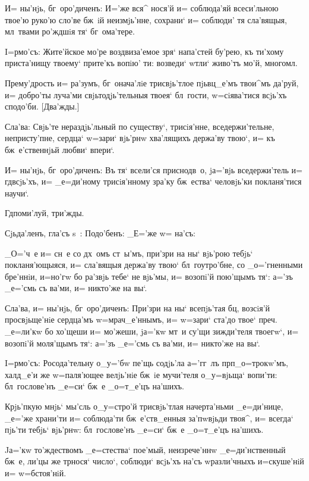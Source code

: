 И= ны'нjь, бг~оро'диченъ: И='же вся^ нося'й и= 
соблюда'яй всеси'льною твое'ю руко'ю сло'ве бж~iй 
неизмjь'нне, сохрани` и= соблюди' тя сла'вящыя, мл~твами 
ро'ждшiя тя` бг~ома'тере.


I=рмо'съ: Жите'йское мо'ре воздвиза'емое зря` 
напа'стей бу'рею, къ ти'хому приста'нищу твоему` прите'къ 
вопiю' ти: возведи` w\т тли` живо'тъ мо'й, многомл.

Прему'дрость и= ра'зумъ, бг~онача'лiе трисвjь'тлое 
пjьвц_е'мъ твои^мъ да'руй, и= добро'ты луча'ми 
свjьтодjь'тельныя твоея` бл~гости, w=сiява'тися всjь'хъ 
сподо'би. [Два'жды.]

Сла'ва: Свjь'те нераздjь'льный по существу`, 
трисiя'нне, вседержи'тельне, непристу'пне, сердца` 
w=зари` вjь'рнw хва'лящихъ держа'ву твою`, и= къ 
бж~е'ственнjьй любви` впери`. 

И= ны'нjь, бг~оро'диченъ: Въ тя` всели'ся приснодв~о, 
jа='вjь вседержи'тель и= гд всjь'хъ, и= _е=ди'ному 
трисiя'нному зра'ку бж~ества` человjь'ки покланя'тися 
научи`. 

Гд поми'луй, три'жды. 

Сjьда'ленъ, гла'съ s~: Подо'бенъ: _Е='же w= на'съ:

_О='ч~е и= сн~е со дх~омъ ст~ы'мъ, при'зри на ны` 
вjь'рою тебjь` покланя'ющыяся, и= сла'вящыя держа'ву 
твою` бл~гоутро'бне, со _о='гненными бре'ннiи, и=но'гw бо 
ра'звjь тебе` не вjь'мы, и= возопi'й пою'щымъ тя`: а='зъ 
_е='смь съ ва'ми, и= никто'же на вы`.

Сла'ва, и= ны'нjь, бг~оро'диченъ: При'зри на ны` 
всепjь'тая бц, возсiя'й просвjьще'нiе сердца'мъ 
w=мрач_е'ннымъ, и= w=зари` ста'до твое` преч. 
_е=ли'кw бо хо'щеши и= мо'жеши, jа='кw мт~и су'щи 
зижди'теля твоегw`, и= возопi'й моля'щымъ тя`: а='зъ 
_е='смь съ ва'ми, и= никто'же на вы`.


I=рмо'съ: Росода'тельну о_у='бw пе'щь содjь'ла 
а='гг~лъ прп _о=трокw'мъ, халд_е'и же w=паля'ющее 
велjь'нiе бж~iе мучи'теля о_у=вjьща` вопи'ти: 
бл~гослове'нъ _е=си` бж~е _о=т_е'цъ на'шихъ.

Крjь'пкую мнjь` мы'сль о_у=стро'й трисвjь'тлая 
начерта'ньми _е=ди'нице, _е='же храни'ти и= соблюда'ти 
бж~е'ств_енныя за'пwвjьди твоя^, и= всегда` пjь'ти тебjь` 
вjь'рнw: бл~гослове'нъ _е=си` бж~е _о=т_е'цъ на'шихъ.

Jа='кw то'ждествомъ _е=стества` пое'мый, неизрече'ннw 
_е=ди'нственный бж~е, ли'цы же тр нося` число`, 
соблюди` всjь'хъ на'съ w\т разли'чныхъ и=скуше'нiй и= 
w=бстоя'нiй.


